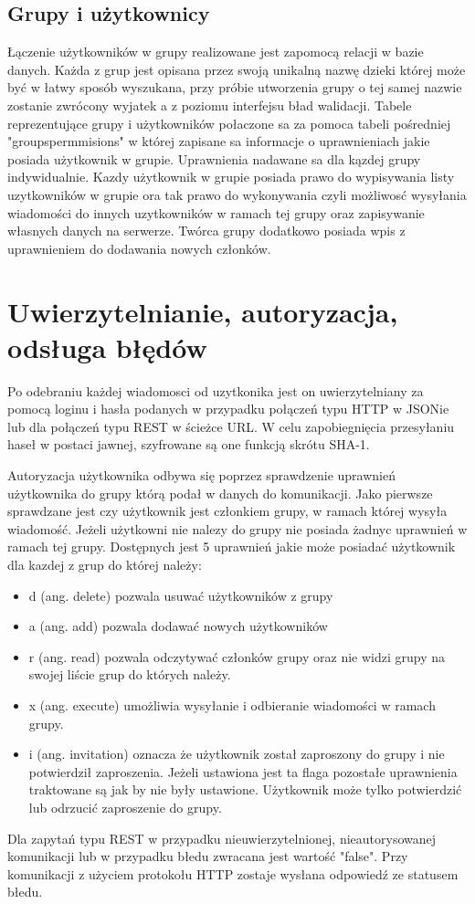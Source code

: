 \documentclass[11pt,a4paper,polish,thesis]{dcsbook}
\begin{document}
\subsection{Grupy i użytkownicy}
Łączenie użytkowników w grupy realizowane jest zapomocą relacji w bazie danych. 
Każda z grup jest opisana przez swoją unikalną nazwę dzieki której może być w łatwy sposób wyszukana, przy próbie utworzenia grupy o tej samej nazwie zostanie zwrócony wyjatek a z poziomu interfejsu bład walidacji.
Tabele reprezentujące grupy i użytkowników połaczone sa za pomoca tabeli pośredniej "groupspermmisions" w której zapisane sa informacje o uprawnieniach jakie posiada użytkownik w grupie. 
Uprawnienia nadawane sa dla kązdej grupy indywidualnie. 
Kazdy użytkownik w grupie posiada prawo do wypisywania listy uzytkowników w grupie ora tak prawo do wykonywania czyli możliwosć wysyłania wiadomości do innych uzytkowników w ramach tej grupy oraz zapisywanie własnych danych na serwerze.
Twórca grupy dodatkowo posiada wpis z uprawnieniem do dodawania nowych członków. 

\section{Uwierzytelnianie, autoryzacja, odsługa błędów} 
Po odebraniu każdej wiadomosci od uzytkonika jest on uwierzytelniany za pomocą loginu i hasła podanych w przypadku połączeń typu HTTP w JSONie lub dla połączeń typu REST w ścieżce URL.
W celu zapobiegnięcia przesyłaniu haseł w postaci jawnej, szyfrowane są one funkcją skrótu SHA-1.

Autoryzacja użytkownika odbywa się poprzez sprawdzenie uprawnień użytkownika do grupy którą podał w danych do komunikacji. 
Jako pierwsze sprawdzane jest czy użytkownik jest członkiem grupy, w ramach której wysyła wiadomość. 
Jeżeli użytkowni nie nalezy do grupy nie posiada żadnyc uprawnień w ramach tej grupy.
Dostępnych jest 5 uprawnień jakie może posiadać użytkownik dla kazdej z grup do której należy:
\begin{itemize}
\item d (ang. delete) pozwala usuwać użytkowników z grupy
\item a (ang. add) pozwala dodawać nowych użytkowników
\item r (ang. read) pozwala odczytywać członków grupy oraz nie widzi grupy na swojej liście grup do których należy.
\item x (ang. execute) umożliwia wysyłanie i odbieranie wiadomości w ramach grupy.
\item i (ang. invitation) oznacza że użytkownik został zaproszony do grupy i nie potwierdził zaproszenia. Jeżeli ustawiona jest ta flaga pozostałe uprawnienia traktowane są jak by nie były ustawione. Użytkownik może tylko potwierdzić lub odrzucić zaproszenie do grupy.
\end{itemize}
Dla zapytań typu REST w przypadku nieuwierzytelnionej, nieautorysowanej komunikacji lub w przypadku błedu zwracana jest wartość "false".
Przy komunikacji z użyciem protokołu HTTP zostaje wysłana odpowiedź ze statusem błedu.
\end{document}
